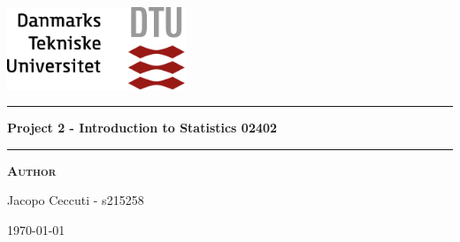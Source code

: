 
\begin{titlepage}
\begin{center}
\vspace{2cm}
\includegraphics[width=0.4\textwidth]{root/dtu.png}~\\[1cm]
\vspace{2cm}

\vspace{2cm}

\hrule
\vspace{.5cm}
{ \huge \bfseries Project 2 - Introduction to Statistics 02402 } %
\vspace{.5cm}

\hrule
\vspace{1.5cm}

\textsc{\textbf{Author}}\\
\vspace{.5cm}
\centering

Jacopo Ceccuti - s215258\\

\vspace{4cm}

\centering \today %
\end{center}
\end{titlepage}